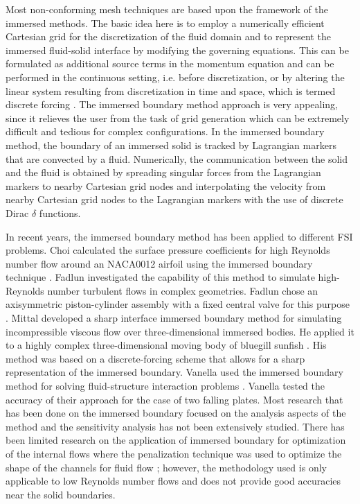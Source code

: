 \documentclass[12pt]{aiaa-pretty}
\begin{document}
Most non-conforming mesh techniques are based upon the framework of the immersed methods. The basic idea here is to employ a numerically efficient Cartesian grid for the discretization of the fluid domain and to represent the immersed fluid-solid interface by modifying the governing equations. This can be formulated as additional source terms in the momentum equation and can be performed in the continuous setting, i.e. before discretization, or by altering the linear system resulting from discretization in time and space, which is termed discrete forcing \cite{mittal2005immersed}. The immersed boundary method approach is very appealing, since it relieves the user from the task of grid generation which can be extremely difficult and tedious for complex configurations. In the immersed boundary method, the boundary of an immersed solid is tracked by Lagrangian markers that are convected by a fluid. Numerically, the communication between the solid and the fluid is obtained by spreading singular forces from the Lagrangian markers to nearby Cartesian grid nodes and interpolating the velocity from nearby Cartesian grid nodes to the Lagrangian markers with the use of discrete Dirac $\delta$ functions.

In recent years, the immersed boundary method has been applied to different FSI problems. Choi calculated the surface pressure coefficients for high Reynolds number flow around an NACA0012 airfoil using the immersed boundary technique \cite{choi2007immersed}. Fadlun investigated the capability of this method to simulate high-Reynolds number turbulent flows in complex geometries. Fadlun chose an axisymmetric piston-cylinder assembly with a fixed central valve for this purpose \cite{fadlun2000combined}. Mittal developed a sharp interface immersed boundary method for simulating incompressible viscous flow over three-dimensional immersed bodies. He applied it to a highly complex three-dimensional moving body of bluegill sunfish \cite{mittal2008versatile}. His method was based on a discrete-forcing scheme that allows for a sharp representation of the immersed boundary. Vanella used the immersed boundary method for solving fluid-structure interaction problems \cite{vanella2010direct}. Vanella tested the accuracy of their approach for the case of two falling plates. Most research that has been done on the immersed boundary focused on the analysis aspects of the method and the sensitivity analysis has not been extensively studied. There has been limited research on the application of immersed boundary for optimization of the internal flows where the penalization technique was used to optimize the shape of the channels for fluid flow \cite{challis2009level, pingen2010parametric, kreissl2012levelset}; however, the methodology used is only applicable to low Reynolds number flows and does not provide good accuracies near the solid boundaries.
\end{document}
